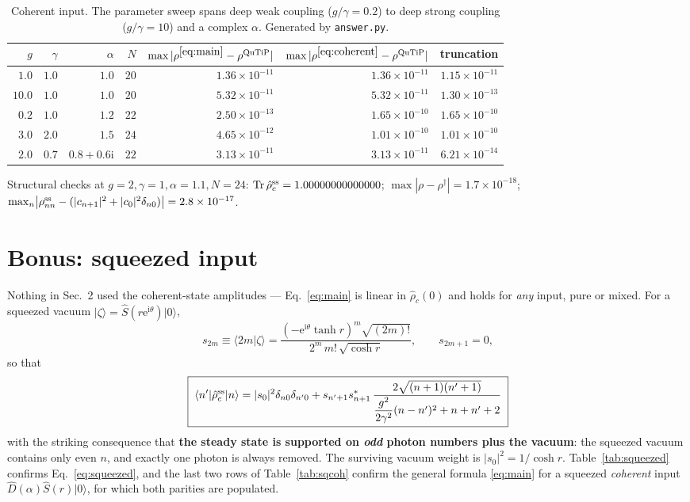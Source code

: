 \documentclass[11pt,a4paper]{article}
\newcommand{\ket}[1]{\lvert #1\rangle}
\newcommand{\bra}[1]{\langle #1\rvert}
\newcommand{\rhoc}{\hat\rho_{c}}
\newcommand{\ii}{\mathrm{i}}
\newcommand{\ee}{\mathrm{e}}
\begin{document}
\begin{table}[h]
\centering\small
\begin{tabular}{rrrr rrr}
\toprule
$g$ & $\gamma$ & $\alpha$ & $N$
& $\max|\rho^{\eqref{eq:main}}-\rho^{\rm QuTiP}|$
& $\max|\rho^{\eqref{eq:coherent}}-\rho^{\rm QuTiP}|$
& truncation \\
\midrule
$1.0$ & $1.0$ & $1.0$ & $20$ & $1.36\times10^{-11}$ & $1.36\times10^{-11}$ & $1.15\times10^{-11}$ \\
$10.0$ & $1.0$ & $1.0$ & $20$ & $5.32\times10^{-11}$ & $5.32\times10^{-11}$ & $1.30\times10^{-13}$ \\
$0.2$ & $1.0$ & $1.2$ & $22$ & $2.50\times10^{-13}$ & $1.65\times10^{-10}$ & $1.65\times10^{-10}$ \\
$3.0$ & $2.0$ & $1.5$ & $24$ & $4.65\times10^{-12}$ & $1.01\times10^{-10}$ & $1.01\times10^{-10}$ \\
$2.0$ & $0.7$ & $0.8+0.6\mathrm{i}$ & $22$ & $3.13\times10^{-11}$ & $3.13\times10^{-11}$ & $6.21\times10^{-14}$ \\
\bottomrule
\end{tabular}
\caption{Coherent input.  The parameter sweep spans deep weak coupling
($g/\gamma=0.2$) to deep strong coupling ($g/\gamma=10$) and a complex
$\alpha$.  Generated by \texttt{answer.py}.}
\label{tab:coherent}
\end{table}

\noindent
Structural checks at $g=2,\gamma=1,\alpha=1.1,N=24$:
$\mathrm{Tr}\,\rhoc^{\rm ss}=1.00000000000000$;
$\max|\rho-\rho^{\dagger}|=1.7\times10^{-18}$;
$\max_n\bigl|\rho^{\rm ss}_{nn}-(|c_{n+1}|^{2}+|c_0|^{2}\delta_{n0})\bigr|
=2.8\times10^{-17}$.

\section{Bonus: squeezed input}

Nothing in Sec.~2 used the coherent-state amplitudes --- Eq.~\eqref{eq:main} is
linear in $\rhoc(0)$ and holds for \emph{any} input, pure or mixed.  For a
squeezed vacuum $\ket\zeta=\hat S(r\ee^{\ii\theta})\ket0$,
\begin{equation}
  s_{2m}\equiv\langle 2m|\zeta\rangle
  =\frac{\left(-\ee^{\ii\theta}\tanh r\right)^{m}\sqrt{(2m)!}}
        {2^{m}\,m!\,\sqrt{\cosh r}},
  \qquad s_{2m+1}=0,
\end{equation}
so that
\begin{equation}
  \boxed{\;
  \bra{n'}\rhoc^{\rm ss}\ket{n}
  =|s_0|^{2}\delta_{n0}\delta_{n'0}
  +s_{n'+1}s^{*}_{n+1}\,
  \frac{2\sqrt{(n+1)(n'+1)}}
  {\dfrac{g^{2}}{2\gamma^{2}}(n-n')^{2}+n+n'+2}\;}
  \label{eq:squeezed}
\end{equation}
with the striking consequence that \textbf{the steady state is supported on
\emph{odd} photon numbers plus the vacuum}: the squeezed vacuum contains only
even $n$, and exactly one photon is always removed.  The surviving vacuum
weight is $|s_0|^{2}=1/\cosh r$.  Table~\ref{tab:squeezed} confirms
Eq.~\eqref{eq:squeezed}, and the last two rows of Table~\ref{tab:sqcoh} confirm
the general formula \eqref{eq:main} for a squeezed \emph{coherent} input
$\hat D(\alpha)\hat S(r)\ket0$, for which both parities are populated.
\end{document}

